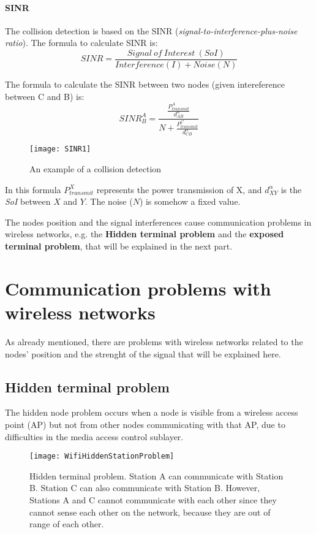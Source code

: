 \paragraph*{SINR} The collision detection is based on the SINR
(\textit{signal-to-interference-plus-noise ratio}). The formula to calculate
SINR is:
\begin{equation}
SINR = \frac{Signal\ of\ Interest\ (SoI)}{Interference(I) + Noise(N)}
\end{equation}

The formula to calculate the SINR between two nodes (given intereference between
C and B) is:
\begin{equation}
SINR^{A}_{B} = \frac{\frac{P^{A}_{transmit}}{d^{\alpha}_{AB}}}{N + \frac{P^{C}_{transmit}}{d^{\alpha}_{CB}}}
\end{equation}

\begin{figure}[t]
  \centering
  \texttt{[image: SINR1]}
  \caption{An example of a collision detection}
\end{figure}

In this formula $P^{X}_{transmit}$ represents the power transmission of X, and
$d^{\alpha}_{XY}$ is the \textit{SoI} between $X$ and $Y$. The noise ($N$) is
somehow a fixed value.

The nodes position and the signal interferences cause communication problems in
wireless networks, e.g. the \textbf{Hidden terminal problem} and the \textbf{
  exposed terminal problem}, that will be explained in the next part.

\section{Communication problems with wireless networks}

As already mentioned, there are problems with wireless networks related to the nodes' position and the strenght of the signal that will be explained here.

\subsection{Hidden terminal problem}

The hidden node problem occurs when a node is visible from a wireless access
point (AP) but not from other nodes communicating with that AP, due to
difficulties in the media access control sublayer.

\begin{figure}[t]
  \centering
  \texttt{[image: WifiHiddenStationProblem]}
  \caption{Hidden terminal problem. Station A can communicate with Station B.
    Station C can also communicate with Station B. However, Stations A and C
    cannot communicate with each other since they cannot sense each other on
    the network, because they are out of range of each other.}
\end{figure}

